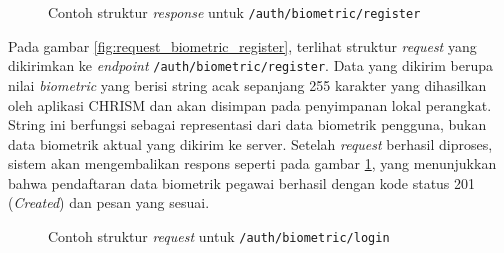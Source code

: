 \begin{figure}
    \centering
    \caption{Contoh struktur \textit{response} untuk \texttt{/auth/biometric/register}}
    \label{fig:response_biometric_register}
\end{figure}

Pada gambar \ref{fig:request_biometric_register}, terlihat struktur \textit{request} yang dikirimkan ke \textit{endpoint} \texttt{/auth/biometric/register}. Data yang dikirim berupa nilai \textit{biometric} yang berisi string acak sepanjang 255 karakter yang dihasilkan oleh aplikasi CHRISM dan akan disimpan pada penyimpanan lokal perangkat. String ini berfungsi sebagai representasi dari data biometrik pengguna, bukan data biometrik aktual yang dikirim ke server. Setelah \textit{request} berhasil diproses, sistem akan mengembalikan respons seperti pada gambar \ref{fig:response_biometric_register}, yang menunjukkan bahwa pendaftaran data biometrik pegawai berhasil dengan kode status 201 (\textit{Created}) dan pesan yang sesuai.
\begin{figure}
    \centering
    \caption{Contoh struktur \textit{request} untuk \texttt{/auth/biometric/login}}
    \label{fig:request_biometric_login}
\end{figure}
